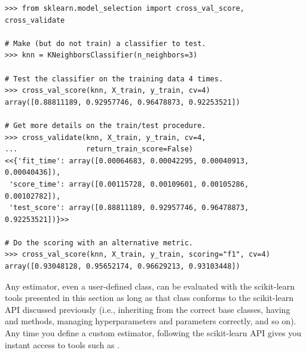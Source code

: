 \begin{lstlisting}
>>> from sklearn.model_selection import cross_val_score, cross_validate

# Make (but do not train) a classifier to test.
>>> knn = KNeighborsClassifier(n_neighbors=3)

# Test the classifier on the training data 4 times.
>>> cross_val_score(knn, X_train, y_train, cv=4)
array([0.88811189, 0.92957746, 0.96478873, 0.92253521])

# Get more details on the train/test procedure.
>>> cross_validate(knn, X_train, y_train, cv=4,
...                return_train_score=False)
<<{'fit_time': array([0.00064683, 0.00042295, 0.00040913, 0.00040436]),
 'score_time': array([0.00115728, 0.00109601, 0.00105286, 0.00102782]),
 'test_score': array([0.88811189, 0.92957746, 0.96478873, 0.92253521])}>>

# Do the scoring with an alternative metric.
>>> cross_val_score(knn, X_train, y_train, scoring="f1", cv=4)
array([0.93048128, 0.95652174, 0.96629213, 0.93103448])
\end{lstlisting}

\begin{info}
Any estimator, even a user-defined class, can be evaluated with the scikit-learn tools presented in this section as long as that class conforms to the scikit-learn API discussed previously (i.e., inheriting from the correct base classes, having  and  methods, managing hyperparameters and parameters correctly, and so on).
Any time you define a custom estimator, following the scikit-learn API gives you instant access to tools such as .
\end{info}

